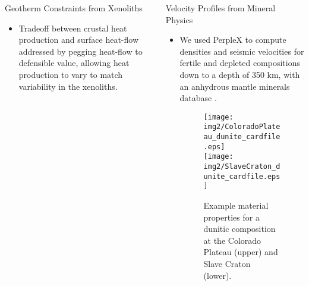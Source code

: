 \documentclass[final]{beamer}
\newlength{\onecolwid}
\newlength{\twocolwid}
\begin{document}
\begin{frame}[t]
\begin{columns}[t]
\begin{column}{\twocolwid}
\begin{columns}[t,totalwidth=\twocolwid]
\begin{column}{\onecolwid}
\begin{block}{Geotherm Constraints from Xenoliths}
\begin{itemize}
\item Tradeoff between crustal heat production and surface heat-flow addressed by pegging heat-flow to defensible value, allowing heat production to vary to match variability in the xenoliths.

\end{itemize}

\end{block}


\end{column} %

\begin{column}{\onecolwid}\vspace{-.6in} %


\begin{block}{Velocity Profiles from Mineral Physics}

\begin{itemize}

\item We used PerpleX \cite{Connolly1990} to compute densities and seismic velocities for fertile and depleted compositions down to a depth of 350 km, with an anhydrous mantle minerals database \cite{Stixrude2011}.

\begin{figure}
\texttt{[image: img2/ColoradoPlateau\_dunite\_cardfile.eps]} \\
\texttt{[image: img2/SlaveCraton\_dunite\_cardfile.eps]} \\
\caption{Example material properties for a dunitic composition at the Colorado Plateau (upper) and Slave Craton (lower).}
\end{figure}




\end{itemize}
\end{block}
\end{column}
\end{columns}
\end{column}
\end{columns}
\end{frame}
\end{document}
